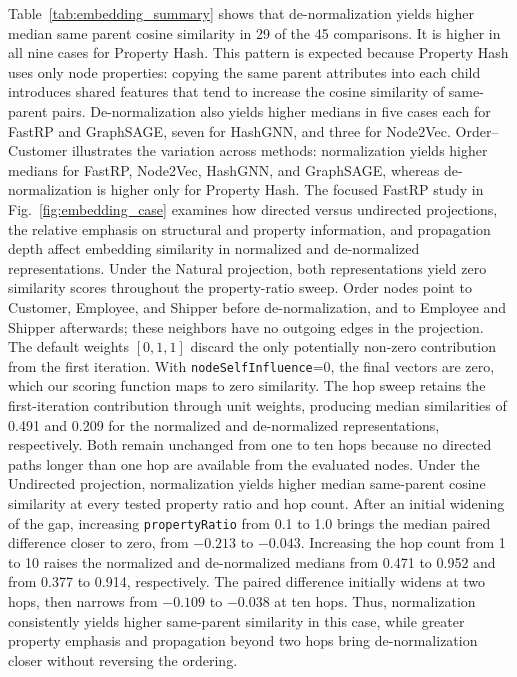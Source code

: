 \documentclass[sigconf]{acmart}
\begin{document}
Table~\ref{tab:embedding_summary} shows that de-normalization yields higher
median same parent cosine similarity in 29 of the 45 comparisons. It is higher
in all nine cases for Property Hash. This pattern is
expected because Property Hash uses only node properties: copying the same
parent attributes into each child introduces shared features that tend to
increase the cosine similarity of same-parent pairs. De-normalization also
yields higher medians in five cases each for FastRP and GraphSAGE, seven for
HashGNN, and three for Node2Vec. Order--Customer
illustrates the variation across methods: normalization yields higher medians
for FastRP, Node2Vec, HashGNN, and GraphSAGE, whereas de-normalization is higher
only for Property Hash. The focused FastRP study in
Fig.~\ref{fig:embedding_case} examines how directed versus undirected
projections, the relative emphasis on structural and property information,
and propagation depth affect embedding similarity in normalized and
de-normalized representations. Under the Natural projection, both
representations yield zero similarity scores throughout the property-ratio
sweep. Order nodes point to Customer, Employee, and Shipper before
de-normalization, and to Employee and Shipper afterwards; these neighbors have
no outgoing edges in the projection. The default weights $[0,1,1]$ discard
the only potentially non-zero contribution from the first iteration. With
\texttt{nodeSelfInfluence}=0, the final vectors are zero, which our scoring
function maps to zero similarity. The hop sweep retains
the first-iteration contribution through unit weights, producing median
similarities of 0.491 and 0.209 for the normalized and de-normalized
representations, respectively. Both remain unchanged from one to ten hops
because no directed paths longer than one hop are available from the evaluated
nodes.
Under the Undirected projection, normalization yields higher median
same-parent cosine similarity at every tested property ratio and hop count.
After an initial widening of the gap, increasing \texttt{propertyRatio} from
0.1 to 1.0 brings the median paired difference closer to zero, from $-0.213$
to $-0.043$. Increasing the hop count from 1 to 10 raises the normalized and
de-normalized medians from 0.471 to 0.952 and from 0.377 to 0.914,
respectively. The paired difference initially widens at two hops, then
narrows from $-0.109$ to $-0.038$ at ten hops. Thus, normalization
consistently yields higher same-parent similarity in this case, while
greater property emphasis and propagation beyond two hops bring
de-normalization closer without reversing the ordering.



\end{document}
